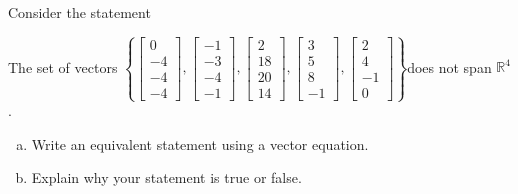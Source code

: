 
\begin{exerciseStatement}


Consider the statement 
\begin{center}\begin{minipage}{0.8\textwidth}
 The set of vectors \( \left\{ \left[\begin{array}{c}
0 \\
-4 \\
-4 \\
-4
\end{array}\right] , \left[\begin{array}{c}
-1 \\
-3 \\
-4 \\
-1
\end{array}\right] , \left[\begin{array}{c}
2 \\
18 \\
20 \\
14
\end{array}\right] , \left[\begin{array}{c}
3 \\
5 \\
8 \\
-1
\end{array}\right] , \left[\begin{array}{c}
2 \\
4 \\
-1 \\
0
\end{array}\right] \right\} \)does not span \(\mathbb{R}^4\). 
\end{minipage}\end{center}
    


\begin{enumerate}[(a)]
\item  Write an equivalent statement using a vector equation.
\item  Explain why your statement is true or false.
\end{enumerate}
    
\end{exerciseStatement}
    
